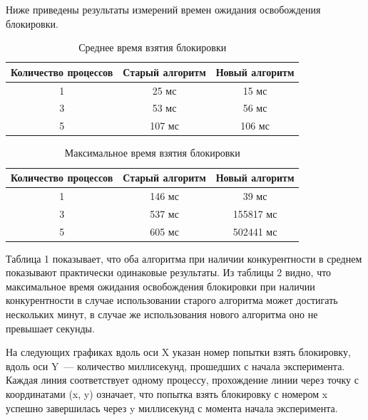 Ниже приведены результаты измерений времен ожидания освобождения блокировки.

\begin{table}[H]
\caption{\label{tab:canonsummary}Среднее время взятия блокировки}
\begin{center}
\begin{tabular}{|c|c|c|}
\hline
Количество процессов & Старый алгоритм & Новый алгоритм \\
\hline
1 & 25 мс & 15 мс \\
\hline
3 & 53 мс & 56 мс \\
\hline
5 & 107 мс & 106 мс \\
\hline
\end{tabular}
\end{center}

\end{table} \begin{table}[H]
\caption{\label{tab:canonsummary}Максимальное время взятия блокировки}
\begin{center}
\begin{tabular}{|c|c|c|}
\hline
Количество процессов & Старый алгоритм & Новый алгоритм \\
\hline
1 & 146 мс & 39 мс \\
\hline
3 & 537 мс & 155817 мс \\
\hline
5 & 605 мс & 502441 мс \\
\hline
\end{tabular}
\end{center}
\end{table} 

Таблица 1 показывает, что оба алгоритма при наличии конкурентности в среднем показывают практически одинаковые результаты.
Из таблицы 2 видно, что максимальное время ожидания освобождения блокировки при наличии конкурентности в случае использовании старого алгоритма может достигать нескольких минут, в случае же использования нового алгоритма оно не превышает секунды.

На следующих графиках вдоль оси X указан номер попытки взять блокировку, вдоль оси Y~--- количество миллисекунд, прошедших с начала эксперимента. Каждая линия соответствует одному процессу, прохождение линии через точку с координатами (x, y) означает, что попытка взять блокировку с номером x успешно завершилась через y миллисекунд с момента начала эксперимента.

